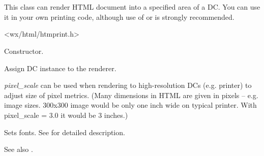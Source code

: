 %
%

\section{}\label{wxhtmldcrenderer}

This class can render HTML document into a specified area of a DC. You can use it
in your own printing code, although use of  
or  is strongly recommended.




<wx/html/htmprint.h>


\label{wxhtmldcrendererwxhtmldcrenderer}


Constructor.

\label{wxhtmldcrenderersetdc}


Assign DC instance to the renderer.

{\it pixel\_scale} can be used when rendering to high-resolution DCs (e.g. printer) to adjust size of pixel metrics.
(Many dimensions in HTML are given in pixels -- e.g. image sizes. 300x300 image would be only one
inch wide on typical printer. With pixel\_scale = 3.0 it would be 3 inches.)

\label{wxhtmldcrenderersetfonts}


Sets fonts. See  for
detailed description.

See also .

\label{wxhtmldcrenderersetsize}


